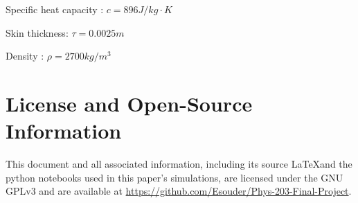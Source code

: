 \documentclass[twocolumn]{article}
\begin{document}
    \hspace{\parindent} Specific heat capacity \cite{alum:other}:
    $c=896 J/kg\cdot K$

    \hspace{\parindent} Skin thickness:
    $\tau = 0.0025m$

    \hspace{\parindent} Density \cite{alum:other}:
    $\rho=2700 kg/m^3$



    

    
     


\section*{License and Open-Source Information}
This document and all associated information, including its source \LaTeX\space and the 
python notebooks used in this paper's simulations, are licensed under the GNU GPLv3 
and are available at \url{https://github.com/Esouder/Phys-203-Final-Project}.
\end{document}
